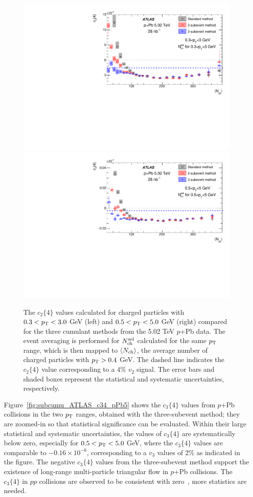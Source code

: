 \begin{figure}[H]
\centering
\includegraphics[width=.475\linewidth]{figs/chapter_subcumu/ATLAS_c24_pPb5_pT0}
\includegraphics[width=.475\linewidth]{figs/chapter_subcumu/ATLAS_c24_pPb5_pT1}
\caption{The $c_2\{4\}$ values calculated for charged particles with $0.3<p_\text{T}<3.0$ GeV (left) and $0.5<p_\text{T}<5.0$ GeV (right) compared for the three cumulant methods from the 5.02 TeV $p$+Pb data. The event averaging is performed for $N_\text{ch}^\text{sel}$ calculated for the same $p_\text{T}$ range, which is then mapped to $\left\langle N_\text{ch}\right\rangle$, the average number of charged particles with $p_\text{T}>0.4$ GeV. The dashed line indicates the $c_2\{4\}$ value corresponding to a $4\%$ $v_2$ signal. The error bars and shaded boxes represent the statistical and systematic uncertainties, respectively.}
\label{fig:subcumu_ATLAS_c24_pPb5}
\end{figure}

Figure~\ref{fig:subcumu_ATLAS_c34_pPb5} shows the $c_3\{4\}$ values from $p$+Pb collisions in the two $p_\text{T}$ ranges, obtained with the three-subevent method; they are zoomed-in so that statistical significance can be evaluated. Within their large statistical and systematic uncertainties, the values of $c_3\{4\}$ are systematically below zero, especially for $0.5<p_\text{T}<5.0$ GeV, where the $c_3\{4\}$ values are comparable to $-0.16\times 10^{-6}$, corresponding to a $v_3$ values of $2\%$ as indicated in the figure. The negative $c_3\{4\}$ values from the three-subevent method support the existence of long-range multi-particle triangular flow in $p$+Pb collisions. The $c_3\{4\}$ in $pp$ collisions are observed to be consistent with zero~\cite{Aaboud:2017blb}, more statistics are needed.

